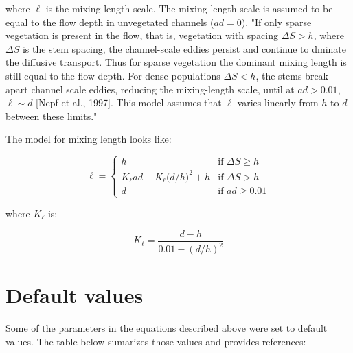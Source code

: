 \documentclass[11pt]{article}
\begin{document}
\noindent where $\ell$ is the mixing length scale. The mixing length scale is assumed to be equal to the flow depth in unvegetated channels ($ad = 0$). "If only sparse vegetation is present in the flow, that is, vegetation with spacing $\Delta S > h$, where $\Delta S$ is the stem spacing, the channel-scale eddies persist and continue to dminate the diffusive transport. Thus for sparse vegetation the dominant mixing length is still equal to the flow depth. For dense populations $\Delta S < h$, the stems break apart channel scale eddies, reducing the mixing-length scale, until at $ad > 0.01$, $\ell \sim d$ [Nepf et al., 1997]. This model assumes that $\ell$ varies linearly from $h$ to $d$ between these limits."

The model for mixing length looks like:

\[
 \ell = 
  \begin{cases} 
   h & \text{if } \Delta S \geq h \\
   K_\ell ad - K_\ell \big(d/h\big)^2 + h    & \text{if } \Delta S > h \\
   d & \text{if } ad \geq 0.01
  \end{cases}
\]

\noindent where $K_\ell$ is:

\begin{equation}
K_\ell = \frac{d-h}{0.01 - (d/h)^2}
\end{equation}

\section{Default values}

Some of the parameters in the equations described above were set to default values. The table below sumarizes those values and provides references:
\end{document}
